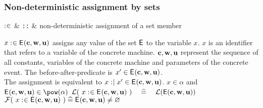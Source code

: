 \begin{samepage}
\subsubsection{Non-deterministic assignment by sets}
\begin{rrnames}
  $\mathrel{:\mkern1mu\in}$ & \texttt{::} & non-deterministic assignment of a set member
\end{rrnames}
\begin{rodinrefentry}
  \rrdesc
    $x \mathrel{:\mkern1mu\in} \textsf{E}_{}(\mathbf{c},\mathbf{w},\mathbf{u})$ assigns any value of the
    set $\textsf{E}$ to the variable $x$. $x$ is an identifier that refers to a variable
    of the concrete machine.
    $\mathbf{c},\mathbf{w},\mathbf{u}$ represent the sequence of all constants, 
    variables of the concrete machine and parameters of the concrete event.
  \rrdef
    The before-after-predicate is $x' \in \textsf{E}_{}(\mathbf{c},\mathbf{w},\mathbf{u})$. \\
    The assignment is equivalent to
    $x \mathrel{:\mkern1mu\mid} x' \in \textsf{E}_{}(\mathbf{c},\mathbf{w},\mathbf{u})$.
  \rrtypes
    $x\in\alpha$ and $\eventbassignmentexpr{}\in\pow(\alpha)$
  \rrwd
    $\mathcal{L}(~x \mathrel{:\mkern1mu\in}\textsf{E}_{}(\mathbf{c},\mathbf{w},\mathbf{u})~)
    \quad\mathrel{\widehat=}\quad
    \mathcal{L}(\textsf{E}(\mathbf{c},\mathbf{w},\mathbf{u}))$
  \rrfis
    $\mathcal{F}(~x \mathrel{:\mkern1mu\in} \textsf{E}_{}(\mathbf{c},\mathbf{w},\mathbf{u})~) \mathrel{\widehat=} \textsf{E}_{}(\mathbf{c},\mathbf{w},\mathbf{u})\neq\mathord\varnothing$
\end{rodinrefentry}
\end{samepage}

